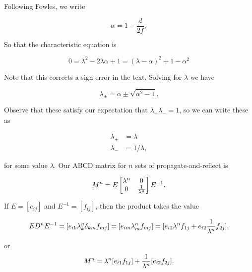 {Following Fowles, we write

\begin{dmath}\label{eqn:problemSet4Problem2:120}
\alpha = 1 - \frac{d}{2 f},
\end{dmath}

So that the characteristic equation is

\begin{dmath}\label{eqn:problemSet4Problem2:140}
0
= 
\lambda^2 - 2 \lambda \alpha + 1
= 
\left( \lambda - \alpha \right)^2 + 1 - \alpha^2
\end{dmath}

Note that this corrects a sign error in the text.  Solving for $\lambda$ we have

\begin{dmath}\label{eqn:problemSet4Problem2:160}
\lambda_{\pm} = \alpha \pm \sqrt{\alpha^2 - 1}.
\end{dmath}

Observe that these satisfy our expectation that $\lambda_{+} \lambda_{-} = 1$, so we can write these as 

\begin{align}\label{eqn:problemSet4Problem2:300}
\lambda_{+} &= \lambda \\
\lambda_{-} &= 1/\lambda,
\end{align}

for some value $\lambda$.  Our ABCD matrix for $n$ sets of propagate-and-reflect is

\begin{dmath}\label{eqn:problemSet4Problem2:260}
M^n = E 
\begin{bmatrix}
\lambda^n & 0 \\
0 & \inv{\lambda^n}
\end{bmatrix}
E^{-1}.
\end{dmath}

If $E = [ e_{i j} ]$ and $E^{-1} = [ f_{i j} ]$, then the product takes the value

\begin{dmath}\label{eqn:problemSet4Problem2:280}
E D^n E^{-1} 
= [ e_{i k} \lambda_k^n \delta_{k m } f_{m j} ]
= [ e_{i m} \lambda_m^n f_{m j} ]
= [ 
e_{i 1} \lambda^n f_{1 j} 
+
e_{i 2} \inv{\lambda^n} f_{2 j} 
],
\end{dmath}

or
\begin{dmath}\label{eqn:problemSet4Problem2:320}
M^n
= 
\lambda^n [ e_{i 1} f_{1 j} ] + \inv{\lambda^n} [ e_{i 2} f_{2 j} ].
\end{dmath}

}
